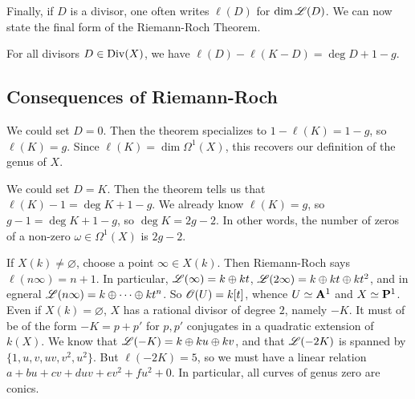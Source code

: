 Finally, if $D$ is a divisor, one often writes $\ell(D)$ for 
$\dim \mathscr{L}(D)$. We can now state the final form of the Riemann-Roch Theorem. 

\begin{theo}
For all divisors $D\in \operatorname{Div}(X)$, we have 
$\ell(D)-\ell(K-D) = \deg D + 1-g$. 
\end{theo}





\subsection{Consequences of Riemann-Roch}

We could set $D=0$. Then the theorem specializes to 
$1-\ell(K)=1-g$, so $\ell(K)=g$. Since $\ell(K)=\dim \Omega^1(X)$, this 
recovers our definition of the genus of $X$. 

We could set $D=K$. Then the theorem tells us that 
$\ell(K)-1 = \deg K+1-g$. We already know $\ell(K)=g$, so 
$g-1=\deg K+1-g$, so $\deg K=2g - 2$. In other words, the number of zeros of 
a non-zero $\omega\in \Omega^1(X)$ is $2 g-2$. 

\begin{example}[$g=0$]
If $X(k)\ne \varnothing$, choose a point $\infty\in X(k)$. Then Riemann-Roch 
says $\ell(n\infty) = n+1$. In particular, $\mathscr{L}(\infty) = k\oplus k t$, 
$\mathscr{L}(2\infty) = k\oplus k t\oplus k t^2$, and in egneral 
$\mathscr{L}(n\infty) = k\oplus \cdots \oplus k t^n$. So 
$\mathscr{O}(U)=k[t]$, whence $U\simeq \mathbf{A}^1$ and $X\simeq \mathbf{P}^1$. 
Even if $X(k)=\varnothing$, $X$ has a rational divisor of degree $2$, namely 
$-K$. It must of be of the form $-K=p+p'$ for $p,p'$ conjugates in a quadratic 
extension of $k(X)$. We know that $\mathscr{L}(-K)=k\oplus k u\oplus k v$, and that 
$\mathscr{L}(-2 K)$ is spanned by $\{1,u,v,u v,v^2,u^2\}$. But 
$\ell(-2 K)=5$, so we must have a linear relation 
$a+b u+c v+d u v+e v^2 + f u^2 + 0$. In particular, all curves of genus zero 
are conics. 
\end{example}

